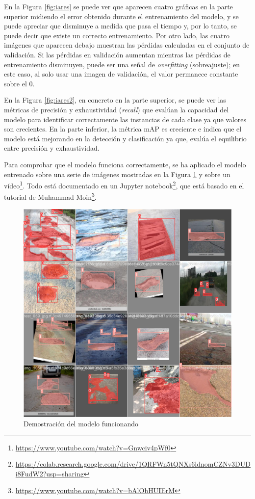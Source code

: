 En la Figura \ref{fig:iares} se puede ver que aparecen cuatro gráficas en la parte superior midiendo el error obtenido durante el entrenamiento del modelo, y se puede apreciar que disminuye a medida que pasa el tiempo y, por lo tanto, se puede decir que existe un correcto entrenamiento. Por otro lado, las cuatro imágenes que aparecen debajo muestran las pérdidas calculadas en el conjunto de validación. Si las pérdidas en validación aumentan mientras las pérdidas de entrenamiento disminuyen, puede ser una señal de \textit{overfitting} (sobreajuste); en este caso, al solo usar una imagen de validación, el valor permanece constante sobre el 0.

En la Figura \ref{fig:iares2}, en concreto en la parte superior, se puede ver las métricas de precisión y exhaustividad (\textit{recall}) que evalúan la capacidad del modelo para identificar correctamente las instancias de cada clase ya que valores son crecientes. En la parte inferior, la métrica \ac{mAP} es creciente e indica que el modelo está mejorando en la detección y clasificación ya que, evalúa el equilibrio entre precisión y exhaustividad.

Para comprobar que el modelo funciona correctamente, se ha aplicado el modelo entrenado sobre una serie de imágenes mostradas en la Figura \ref{fig:trainex} y sobre un vídeo\footnote{\url{https://www.youtube.com/watch?v=Gnwciv4pWf0}}. Todo está documentado en un Jupyter notebook\footnote{\url{https://colab.research.google.com/drive/1QRFWn5tQNXs6ldnomCZNv3DUDi8FudW2?usp=sharing}}, que está basado en el tutorial de Muhammad Moin\footnote{\url{https://www.youtube.com/watch?v=bAlObHUIErM}}.

 \begin{figure} [h!]
	\begin{center}
		\includegraphics[width=13cm]{figs/cap6/train_results.jpg}
	\end{center}
	\caption{Demostración del modelo funcionando}
	\label{fig:trainex}
\end{figure}

